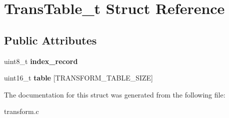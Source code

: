 \hypertarget{struct_trans_table__t}{}\section{Trans\+Table\+\_\+t Struct Reference}
\label{struct_trans_table__t}
\subsection*{Public Attributes}
\begin{DoxyCompactItemize}
\item 
\mbox{\label{struct_trans_table__t_a5db908d7b13a4bef0acf7acbc485276f}} 
uint8\+\_\+t {\bfseries index\+\_\+record}
\item 
\mbox{\label{struct_trans_table__t_a5f041dda53ebf93d2f07a610c13bf86c}} 
uint16\+\_\+t {\bfseries table} \mbox{[}T\+R\+A\+N\+S\+F\+O\+R\+M\+\_\+\+T\+A\+B\+L\+E\+\_\+\+S\+I\+ZE\mbox{]}
\end{DoxyCompactItemize}


The documentation for this struct was generated from the following file\+:\begin{DoxyCompactItemize}
\item 
transform.\+c\end{DoxyCompactItemize}
